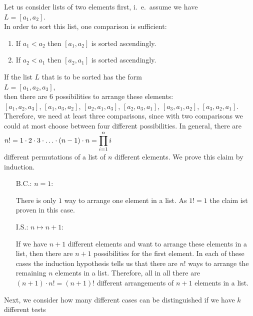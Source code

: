 Let us consider lists of two elements first, i.~e.~assume we have
\\[0.2cm]
\hspace*{1.3cm}
$L = [a_1, a_2]$.  
\\[0.2cm]
In order to sort this list, one comparison is sufficient:
\begin{enumerate}
 \item If $a_1 < a_2$ then $[a_1, a_2]$ is sorted ascendingly.
 \item If $a_2 < a_1$ then $[a_2, a_1]$ is sorted ascendingly.
\end{enumerate}
If the list $L$ that is to be sorted has the form
\\[0.2cm]
\hspace*{1.3cm}
$L = [a_1,a_2,a_3]$,
\\[0.2cm]
then there are 6 possibilities to arrange these elements:
\\[0.2cm]
\hspace*{0.3cm}
$[a_1,a_2,a_3]$, \quad
$[a_1,a_3,a_2]$, \quad
$[a_2,a_1,a_3]$, \quad
$[a_2,a_3,a_1]$, \quad
$[a_3,a_1,a_2]$, \quad
$[a_3,a_2,a_1]$. 
\\[0.2cm]
Therefore, we need at least three comparisons, since with two comparisons we could at most choose between
four different possibilities.  In general, there are 
\\[0.2cm]
\hspace*{1.3cm}
$\displaystyle n! = 1 \cdot 2 \cdot 3 \cdot {\dots} \cdot (n-1) \cdot n = \prod\limits_{i=1}^n i$ 
\\[0.2cm]
different permutations of a list of $n$ different elements. 
We prove this claim by induction. 
\begin{enumerate}
\item[B.C.:] $n=1$:  

      There is only $1$ way to arrange one element in a list.  As $1! = 1$ the claim ist proven
      in this case.
\item[I.S.:] $n \mapsto n+1$:
  
      If we have $n+1$ different elements and want to arrange these elements in a list, then there
      are $n+1$ possibilities for the first element.  In each of these cases the induction
      hypothesis tells us that there are $n!$ ways to arrange the remaining $n$ elements in a list.
      Therefore, all in all there are $(n+1) \cdot n! = (n+1)!$ different arrangements of $n+1$
      elements in a list.
\end{enumerate}
Next, we consider how many different cases can be distinguished if we have $k$ different tests
